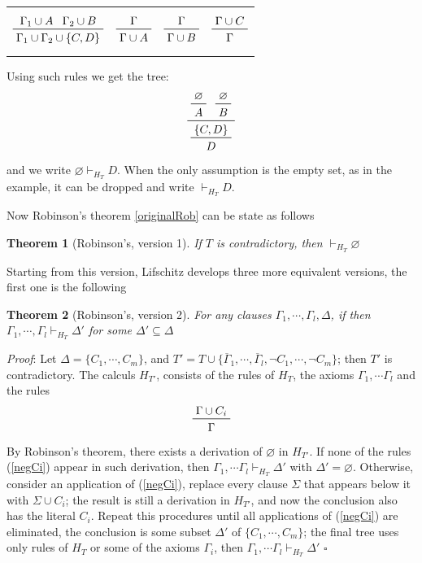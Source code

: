 \documentclass[a4paper,12pt,oneside]{book}
\newtheorem{theorem}{Theorem}[chapter]
\newcommand*{\QED}{\hfill\ensuremath{\square}}
\let\emptyset\varnothing
\begin{document}
\begin{center}
\begin{tabular}{cccc}
$$\prftree{\Gamma_1 \cup A } {\Gamma_2\cup B} {\Gamma_1\cup\Gamma_2\cup \{C,D\}} 
$$
& \hspace{5mm}
$$\prftree{\Gamma }  {\Gamma\cup A} 
$$
& \hspace{5mm}
$$\prftree{\Gamma }  {\Gamma\cup B} 
$$
& \hspace{5mm}
$$\prftree{\Gamma \cup C }  {\Gamma }
$$
\end{tabular}
\end{center}
Using such rules we get the tree:
$$
\prftree{\prftree{\emptyset}{A}}{\prftree{\emptyset}{B}}
{\prftree{\{C , D\}}{D}}
$$
and we write $\emptyset \vdash_{H_T} D$.  When the only assumption is the empty set, as in the example, it can be dropped and write $\vdash_{H_T} D$.

Now Robinson's theorem \ref{originalRob} can be state as follows
\begin{theorem}[Robinson's, version 1]
If $T$ is contradictory, then $\vdash_{H_T} \emptyset$
\end{theorem}
\noindent Starting from this version, Lifschitz develops three more equivalent versions, the first one is the following
\begin{theorem}[Robinson's, version 2]\label{robinson2}
For any clauses $\Gamma_1,\cdots,\Gamma_l,\Delta$, 
if  then $\Gamma_1,\cdots ,\Gamma_l\vdash_{H_T} \Delta'$ for some $\Delta'\subseteq\Delta$
\end{theorem}

\textit{Proof}: Let $\Delta=\{C_1,\cdots,C_m\}$, and $T'= T\cup\{ \overline{\Gamma}_1, \cdots ,\overline{\Gamma}_l, \neg C_1,\cdots ,\neg C_m\}  $; then $T'$ is contradictory.
The calculs $H_{T'}$, consists of the rules of $H_T$, the axioms $\Gamma_1,\cdots\Gamma_l$ and the rules
\begin{equation}\label{negCi}
\prftree{\Gamma\cup C_i }{\Gamma }
\end{equation}
By Robinson's theorem, there exists a derivation of $\emptyset$ in $H_{T'}$. If none of the rules (\ref{negCi}) appear in such derivation, then $\Gamma_1,\cdots\Gamma_l\vdash_{H_T} \Delta'$ with $\Delta'=\emptyset$. Otherwise, consider an application of (\ref{negCi}), replace every clause $\Sigma$ that appears below it with $\Sigma\cup C_i$; the result is still a derivation in $H_{T'}$, and now the conclusion also has the literal $C_i$. Repeat this procedures until all applications of (\ref{negCi}) are eliminated, the conclusion is some subset $\Delta'$ of 	$\{C_1,\cdots,C_m\}$; the final tree uses only rules of $H_T$ or some of the axioms $\Gamma_i$, then 
$\Gamma_1,\cdots\Gamma_l\vdash_{H_T} \Delta'$
\QED
\end{document}
